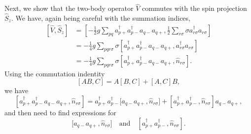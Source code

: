 Next, we show that the two-body operator $\hat{V}$ commutes with the spin projection $\hat{S}_z$.
We have, again being careful with the summation indices,
\begin{align*}
    \left[ \hat{V}, \hat{S}_z \right]
    &= \left[
        -\frac{1}{2} g \sum_{pq} a_{p+}^\dagger a_{p-}^\dagger a_{q-} a_{q+},
        \frac{1}{2} \sum_{r\sigma} \sigma a^\dag_{r\sigma} a_{r\sigma}
    \right] \\
    &= -\frac{1}{4} g \sum_{pqr \sigma} \sigma \left[
        a_{p+}^\dagger a_{p-}^\dagger a_{q-} a_{q+},
        a^\dag_{r\sigma} a_{r\sigma}
    \right] \\
    &= -\frac{1}{4} g \sum_{pqr \sigma} \sigma \left[
        a_{p+}^\dagger a_{p-}^\dagger a_{q-} a_{q+},
        \hat{n}_{r\sigma}
    \right].
\end{align*}
Using the commutation indentity
\begin{equation*}
    \left[ AB, C \right] = A \left[B, C \right] + \left[ A, C \right] B,
\end{equation*}
we have
\begin{equation}\label{eq:double_comm}
    \left[ a_{p+}^\dagger a_{p-}^\dagger a_{q-} a_{q+}, \hat{n}_{r\sigma} \right]
    = a_{p+}^\dagger a_{p-}^\dagger \Big[ a_{q-} a_{q+}, \hat{n}_{r\sigma} \Big] + \left[ a_{p+}^\dagger a_{p-}^\dagger, \hat{n}_{r\sigma} \right] a_{q-} a_{q+},
\end{equation}
and then need to find expressions for
\begin{equation*}
    \Big[ a_{q-} a_{q+}, \hat{n}_{r\sigma} \Big] \quad \text{and} \quad \left[ a_{p+}^\dagger a_{p-}^\dagger, \hat{n}_{r\sigma} \right].
\end{equation*}

